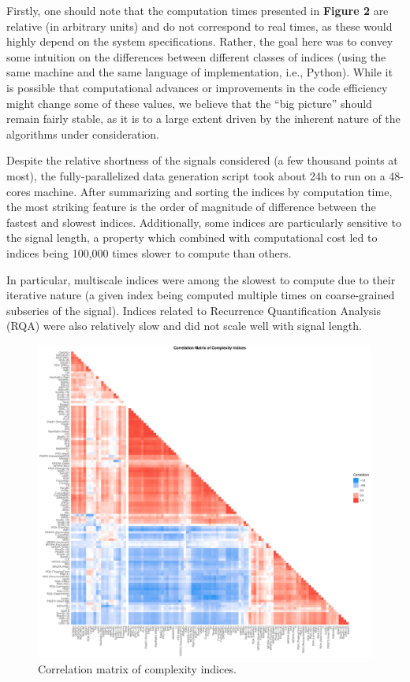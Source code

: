 \documentclass[
  man]{apa6}
\begin{document}
Firstly, one should note that the computation times presented in \textbf{Figure 2} are relative (in arbitrary units) and do not correspond to real times, as these would highly depend on the system specifications. Rather, the goal here was to convey some intuition on the differences between different classes of indices (using the same machine and the same language of implementation, i.e., Python). While it is possible that computational advances or improvements in the code efficiency might change some of these values, we believe that the ``big picture'' should remain fairly stable, as it is to a large extent driven by the inherent nature of the algorithms under consideration.

Despite the relative shortness of the signals considered (a few thousand points at most), the fully-parallelized data generation script took about 24h to run on a 48-cores machine. After summarizing and sorting the indices by computation time, the most striking feature is the order of magnitude of difference between the fastest and slowest indices. Additionally, some indices are particularly sensitive to the signal length, a property which combined with computational cost led to indices being 100,000 times slower to compute than others.

In particular, multiscale indices were among the slowest to compute due to their iterative nature (a given index being computed multiple times on coarse-grained subseries of the signal). Indices related to Recurrence Quantification Analysis (RQA) were also relatively slow and did not scale well with signal length.

\begin{figure}
\centering
\includegraphics{./figures/correlation-1.pdf}
\caption{\label{fig:correlation}Correlation matrix of complexity indices.}
\end{figure}
\end{document}
